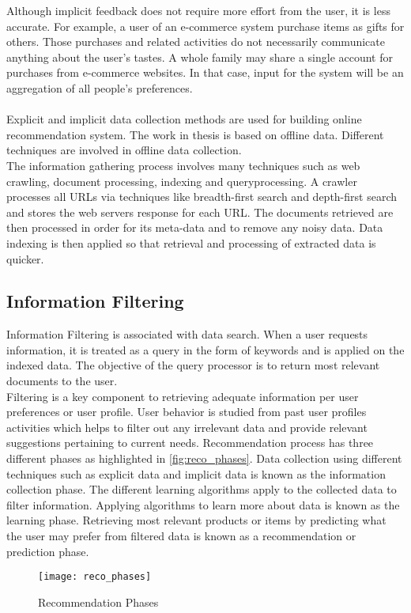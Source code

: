 \noindent Although implicit feedback does not require more effort from the user, it is less accurate. For example, a user of an e-commerce system purchase items as gifts for others. Those purchases and related activities do not necessarily communicate anything about the user’s tastes. A whole family may share a single account for purchases from e-commerce websites. In that case, input for the system will be an aggregation of all people's preferences.
\\
\\
Explicit and implicit data collection methods are used for building online recommendation system. The work in thesis is based on offline data. Different techniques are involved in offline data collection. \\
The information gathering process involves many techniques such as web crawling, document processing, indexing and queryprocessing. A crawler processes all URLs via techniques like breadth-first search and depth-first search and stores the web servers response for each URL. The documents retrieved are then processed in order for its meta-data and to remove any noisy data. Data indexing is then applied so that retrieval and processing of extracted data is quicker. 


\subsection{Information Filtering}

Information Filtering is associated with data search. When a user requests information, it is treated as a query in the form of keywords and is applied on the indexed data. The objective of the query processor is to return most relevant documents to the user.
\\
\noindent Filtering is a key component to retrieving adequate information per user preferences or user profile. User behavior is studied from past user profiles activities which helps to filter out any irrelevant data and provide relevant suggestions pertaining to current needs. 
Recommendation process has three different phases as highlighted in \autoref{fig:reco_phases}. Data collection using different techniques such as explicit data and implicit data is known as the information collection phase. The different learning algorithms apply to the collected data to filter information. Applying algorithms to learn more about data is known as the learning phase. 
Retrieving most relevant products or items by predicting what the user may prefer from filtered data is known as a recommendation or prediction phase. 
\\
\begin{figure}[H]
	\centering
	\texttt{[image: reco\_phases]}
	\caption{Recommendation Phases \cite{33}}
	\label{fig:reco_phases}
\end{figure}
